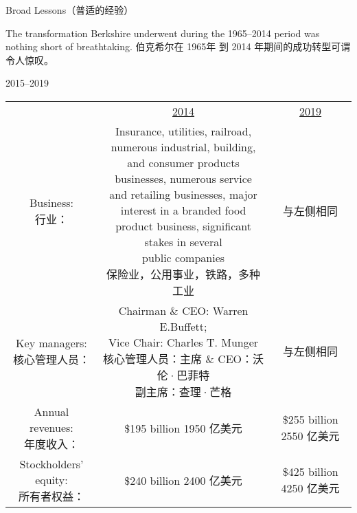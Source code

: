 \begin{section}{Broad Lessons（普适的经验）}
\begin{verseparallel}
  {
    The transformation Berkshire underwent during the 1965–2014 period was
    nothing short of breathtaking.
  }
  {
    伯克希尔在 1965年 到 2014 年期间的成功转型可谓令人惊叹。
  }
\end{verseparallel}

\end{section}

\theendnotes{}

\begin{chapter}{2015--2019}

\begin{table}[!htbp]
  \centering
  \begin{center}
    \hspace*{-2cm}
    \begin{tabular}{ccc}
      \toprule
       & \underline{2014} & \underline{2019} \\
      \makecell[c]{Business: \\ 行业：} & \makecell[c]{Insurance, utilities, railroad, numerous industrial, building, \\ and consumer products
      businesses, numerous service \\ and retailing businesses, major interest in a branded food \\
      product business, significant stakes in several \\ public companies \\ 保险业，公用事业，铁路，多种工业 \\} & 与左侧相同 \\
      \makecell[c]{Key managers: \\ 核心管理人员：} & \makecell[c]{Chairman \& CEO: Warren E.\@ Buffett; \\ Vice Chair: Charles T. Munger \\ 核心管理人员：主席 \& CEO：沃伦·巴菲特 \\ 副主席：查理·芒格} & 与左侧相同 \\
      \makecell[c]{Annual revenues: \\ 年度收入：} & \makecell[c]{\$195 billion \\ 1950 亿美元} & \makecell[c]{\$255 billion \\ 2550 亿美元} \\
      \makecell[c]{Stockholders' equity: \\ 所有者权益：} & \makecell[c]{\$240 billion \\ 2400 亿美元} & \makecell[c]{\$425 billion \\ 4250 亿美元} \\

\end{tabular}
\end{center}
\end{table}
\end{chapter}

